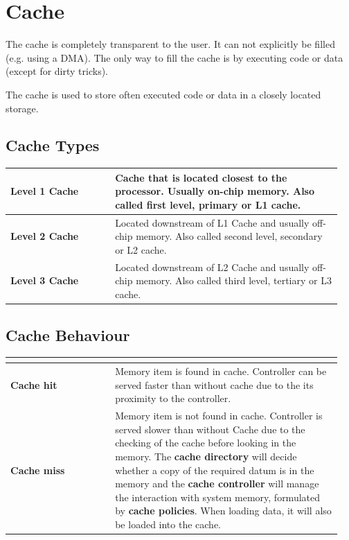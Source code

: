 \section{Cache }
	The cache is completely transparent to the user. It can not explicitly be filled (e.g. using a DMA). The only way to fill the cache is by executing code or data (except for dirty tricks).
	
	The cache is used to store often executed code or data in a closely located storage.
	
	\subsection{Cache Types}
		\begin{table}[H]
			\centering
			\begin{tabular}{|>{\bfseries}p{0.3\linewidth}|p{0.65\linewidth}|}
				\hline
				Level 1 Cache
					& Cache that is located closest to the processor. Usually on-chip memory. Also called first level, primary or L1 cache.\\
				\hline
				Level 2 Cache
					& Located downstream of L1 Cache and usually off-chip memory. Also called second level, secondary or L2 cache.\\
				\hline
				Level 3 Cache
					& Located downstream of L2 Cache and usually off-chip memory. Also called third level, tertiary or L3 cache.\\
				\hline	
			\end{tabular}
		\end{table}
		
	\subsection{Cache Behaviour }
	
		\begin{table}[H]
			\centering
			\begin{tabular}{|>{\bfseries}p{0.3\linewidth}|p{0.65\linewidth}|}
				\hline
				\multicolumn{2}{|c|}{Controller is looking for a memory item}\\
				\hline
				Cache hit
					& Memory item is found in cache. Controller can be served faster than without cache due to the its proximity to the controller.\\
				\hline
				Cache miss
					& Memory item is not found in cache. Controller is served slower than without Cache due to the checking of the cache before looking in the memory. The \textbf{cache directory} will decide whether a copy of the required datum is in the memory and the \textbf{cache controller} will manage the interaction with system memory, formulated by \textbf{cache policies}. When loading data, it will also be loaded into the cache.\\
				\hline
			\end{tabular}
		\end{table}
		
